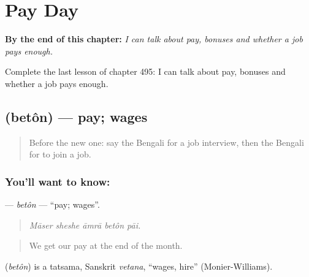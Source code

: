 
\chapter{Pay Day}
\label{ch:bn-pay-day}

\begin{chapteropening}
\textbf{By the end of this chapter:} \emph{I can talk about pay, bonuses and whether a job pays enough.}

Complete the last lesson of chapter 495: I can talk about pay, bonuses and whether a job pays enough.
\end{chapteropening}

\section[\texorpdfstring{\bn{বেতন} (betôn)}{বেতন (betôn)}]{ (betôn) — pay; wages}

\label{lesson:BN-C495-beton}



\begin{quote}
Before the new one: say the Bengali for a job interview, then the Bengali for to join a job.
\end{quote}

\subsection*{You'll want to know: }
\textbf{} — \emph{betôn} — \textquotedblleft{}pay; wages\textquotedblright{}.

\begin{quote}
    
\end{quote}

\begin{quote}
\emph{Māser sheshe āmrā betôn pāi.}
\end{quote}

\begin{quote}
We get our pay at the end of the month.
\end{quote}

\begin{cousinweb}
\textbf{} (\emph{betôn}) is a tatsama, Sanskrit \emph{vetana}, \textquotedblleft{}wages, hire\textquotedblright{} (Monier-Williams).
\end{cousinweb}

